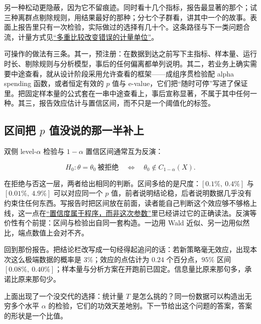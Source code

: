 另一种松动更隐蔽，因为它不留痕迹。同时看十几个指标，报告最显著的那个；试三种离群点剔除规则，用结果最好的那种；分七个子群看，讲其中一个的故事。表面上报告里只有一次检验，实际做过的选择有几十个。这条路径与下一类问题合流，计量方式见\hyperref[sec:11-Mathematical-Statistics/05-Hypothesis-Testing/04]{``多重比较改变错误的计量单位''}。

可操作的做法有三条。其一，预注册：在数据到达之前写下主指标、样本量、运行时长、剔除规则与分析模型，事后的任何偏离都单列说明。其二，若业务上确实需要中途查看，就从设计阶段采用允许查看的框架——成组序贯检验配 alpha spending 函数，或者恒定有效的 \(p\) 值与 e-value，它们把``随时可停''写进了保证里。把固定样本量的公式套在一串中途查看上，事后宣称显著，不属于其中任何一种。其三，报告效应估计与置信区间，而不只是一个阈值化的标签。

\subsection{区间把 \texorpdfstring{\(p\)}{p} 值没说的那一半补上}

双侧 level-\(\alpha\) 检验与 \(1-\alpha\) 置信区间通常互为反演：

\[
H_0:\theta=\theta_0\ \text{被拒绝}
\quad\Longleftrightarrow\quad
\theta_0\notin C_{1-\alpha}(X).
\]

在拒绝与否这一层，两者给出相同的判断。区间多给的是尺度：\([0.1\%,\ 0.4\%]\) 与 \([0.01\%,\ 4.9\%]\) 可以对应同一个 \(p\) 值，前者说明结论稳，后者说明数据几乎没有约束住任何东西。写报告时把区间放在前面，读者能自己判断这个效应够不够格上线，这一点在\hyperref[sec:11-Mathematical-Statistics/04-Interval-Estimation/01]{``置信度属于程序，而非这次参数''}里已经讲过它的正确读法。反演等价性有个前提：区间与检验出自同一套构造。一边用 Wald 近似、另一边用似然比，端点数值上会对不齐。

回到那份报告。把结论栏改写成一句经得起追问的话：若新策略毫无效应，出现本次这么极端数据的概率是 \(3\%\)；效应的点估计为 \(0.24\) 个百分点，\(95\%\) 区间 \([0.08\%,\ 0.40\%]\)；样本量与分析方案在开跑前已固定。信息量比原来那句多，承诺比原来那句少。

上面出现了一个没交代的选择：统计量 \(T\) 是怎么挑的？同一份数据可以构造出无穷多个水平 \(\alpha\) 的检验，它们的功效天差地别。下一节给出这个问题的答案，答案的形状是一个比值。
